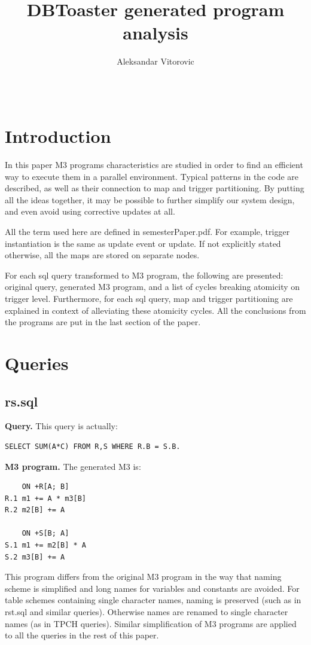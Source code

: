 \documentclass{sig-semester}
\title{DBToaster generated program analysis}
\author{\alignauthor Aleksandar Vitorovic \\[1ex]
\affaddr{Dept.\ of Computer Science} \\
\affaddr{EPFL} \\
\affaddr{aleksandar.vitorovic@epfl.ch}
}
\begin{document}
\maketitle



\section{Introduction}
\vspace{2mm}
In this paper M3 programs characteristics are studied in order to find an efficient way to execute them in a parallel environment. Typical patterns in the code are described, as well as their connection to map and trigger partitioning. By putting all the ideas together, it may be possible to further simplify our system design, and even avoid using corrective updates at all.

All the term used here are defined in semesterPaper.pdf. For example, trigger instantiation is the same as update event or update. If not explicitly stated otherwise, all the maps are stored on separate nodes.

For each sql query transformed to M3 program, the following are presented: original query, generated M3 program, and a list of cycles breaking atomicity on trigger level. Furthermore, for each sql query, map and trigger partitioning are explained in context of alleviating these atomicity cycles. All the conclusions from the programs are put in the last section of the paper.

\section{Queries}
\vspace{2mm}

\subsection{rs.sql}
\textbf{Query.} This query is actually:
\begin{verbatim}
SELECT SUM(A*C) FROM R,S WHERE R.B = S.B.
\end{verbatim}

\textbf{M3 program.} The generated M3 is:
\begin{verbatim}
    ON +R[A; B] 
R.1 m1 += A * m3[B]
R.2 m2[B] += A

    ON +S[B; A] 
S.1 m1 += m2[B] * A
S.2 m3[B] += A
\end{verbatim}
This program differs from the original M3 program in the way that naming scheme is simplified and long names for variables and constants are avoided. For table schemes containing single character names, naming is preserved (such as in rst.sql and similar queries). Otherwise names are renamed to single character names (as in TPCH queries). Similar simplification of M3 programs are applied to all the queries in the rest of this paper.
\end{document}
